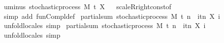 \begin{isabellebody}
\isamarkupfalse%
\ uminus{\isacharcolon}{\kern0pt}\ {\isachardoublequoteopen}stochastic{\isacharunderscore}{\kern0pt}process\ M\ t\ {\isacharparenleft}{\kern0pt}{\isacharminus}{\kern0pt}X{\isacharparenright}{\kern0pt}{\isachardoublequoteclose}%
\isadelimproof
\ %
\endisadelimproof
%
\isatagproof
{}\isamarkupfalse%
\ scaleR{\isacharunderscore}{\kern0pt}right{\isacharunderscore}{\kern0pt}const{\isacharbrackleft}{\kern0pt}of\ {\isachardoublequoteopen}{\isasymlambda}{\isacharunderscore}{\kern0pt}{\isachardot}{\kern0pt}\ {\isacharminus}{\kern0pt}{}{\isachardoublequoteclose}{\isacharbrackright}{\kern0pt}\ \isamarkupfalse%
\ {\isacharparenleft}{\kern0pt}simp\ add{\isacharcolon}{\kern0pt}\ fun{\isacharunderscore}{\kern0pt}Compl{\isacharunderscore}{\kern0pt}def{\isacharparenright}{\kern0pt}%
\endisatagproof
{\isafoldproof}%
%
\isadelimproof
%
\endisadelimproof
\isanewline
\isanewline
{}\isamarkupfalse%
\ partial{\isacharunderscore}{\kern0pt}sum{\isacharcolon}{\kern0pt}\ {\isachardoublequoteopen}stochastic{\isacharunderscore}{\kern0pt}process\ M\ t\ {\isacharparenleft}{\kern0pt}{\isasymlambda}n\ {\isasymxi}{\isachardot}{\kern0pt}\ {\isasymSum}i{\isasymin}{\isacharbraceleft}{\kern0pt}tn{\isacharbraceright}{\kern0pt}{\isachardot}{\kern0pt}\ X\ i\ {\isasymxi}{\isacharparenright}{\kern0pt}{\isachardoublequoteclose}%
\isadelimproof
\ %
\endisadelimproof
%
\isatagproof
{}\isamarkupfalse%
\ {\isacharparenleft}{\kern0pt}unfold{\isacharunderscore}{\kern0pt}locales{\isacharparenright}{\kern0pt}\ simp%
\endisatagproof
{\isafoldproof}%
%
\isadelimproof
%
\endisadelimproof
\isanewline
\isanewline
{}\isamarkupfalse%
\ partial{\isacharunderscore}{\kern0pt}sum{\isacharprime}{\kern0pt}{\isacharcolon}{\kern0pt}\ {\isachardoublequoteopen}stochastic{\isacharunderscore}{\kern0pt}process\ M\ t\ {\isacharparenleft}{\kern0pt}{\isasymlambda}n\ {\isasymxi}{\isachardot}{\kern0pt}\ {\isasymSum}i{\isasymin}{\isacharbraceleft}{\kern0pt}tn{\isacharbraceright}{\kern0pt}{\isachardot}{\kern0pt}\ X\ i\ {\isasymxi}{\isacharparenright}{\kern0pt}{\isachardoublequoteclose}%
\isadelimproof
\ %
\endisadelimproof
%
\isatagproof
{}\isamarkupfalse%
\ {\isacharparenleft}{\kern0pt}unfold{\isacharunderscore}{\kern0pt}locales{\isacharparenright}{\kern0pt}\ simp%

\end{isabellebody}
